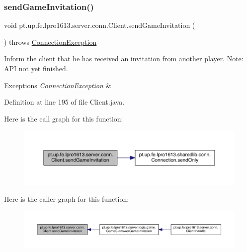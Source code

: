 \subsubsection{\texorpdfstring{send\+Game\+Invitation()}{sendGameInvitation()}}
{\footnotesize\ttfamily void pt.\+up.\+fe.\+lpro1613.\+server.\+conn.\+Client.\+send\+Game\+Invitation (\begin{DoxyParamCaption}{ }\end{DoxyParamCaption}) throws \hyperlink{classpt_1_1up_1_1fe_1_1lpro1613_1_1sharedlib_1_1exceptions_1_1_connection_exception}{Connection\+Exception}}

Inform the client that he has received an invitation from another player. Note\+: A\+PI not yet finished.


\begin{DoxyExceptions}{Exceptions}
{\em Connection\+Exception} & \\
\hline
\end{DoxyExceptions}


Definition at line 195 of file Client.\+java.

Here is the call graph for this function\+:
\nopagebreak
\begin{figure}[H]
\begin{center}
\leavevmode
\includegraphics[width=350pt]{classpt_1_1up_1_1fe_1_1lpro1613_1_1server_1_1conn_1_1_client_a2d18ebb9809e36b016e9db24c8274522_cgraph}
\end{center}
\end{figure}
Here is the caller graph for this function\+:
\nopagebreak
\begin{figure}[H]
\begin{center}
\leavevmode
\includegraphics[width=350pt]{classpt_1_1up_1_1fe_1_1lpro1613_1_1server_1_1conn_1_1_client_a2d18ebb9809e36b016e9db24c8274522_icgraph}
\end{center}
\end{figure}
\hypertarget{classpt_1_1up_1_1fe_1_1lpro1613_1_1server_1_1conn_1_1_client_a68fc46855fd613c9ca06c32da08c2f5a}{}\label{classpt_1_1up_1_1fe_1_1lpro1613_1_1server_1_1conn_1_1_client_a68fc46855fd613c9ca06c32da08c2f5a} 
